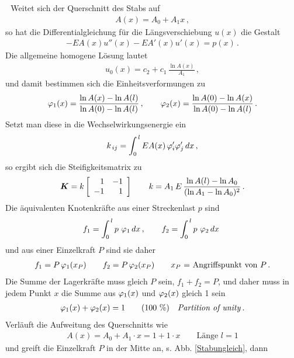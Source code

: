 {\,\, Weitet sich der Querschnitt des Stabs auf}
\begin{align}
A(x) = A_0 + A_1 x\,,
\end{align}
so hat die Differentialgleichung f\"{u}r die L\"{a}ngsverschiebung $u(x)$ die Gestalt
 \begin{align}
  - EA(x) u''(x) -EA'(x) u'(x) = p(x) \,.
\end{align}
Die allgemeine homogene L\"{o}sung lautet
\begin{align}
u_0(x) = c_2 + c_1\,\frac{\ln A(x)}{A_1}\,,
\end{align}
und damit bestimmen sich die Einheitsverformungen zu
\begin{align}
\Np_1(x) = \frac{\ln A(x) - \ln A(l)}{\ln A(0) - \ln A(l)}\,, \qquad
\Np_2(x) = \frac{\ln A(0) - \ln A(x)}{\ln A(0) - \ln A(l)}\,.
\end{align}
Setzt man diese in die Wechselwirkungsenergie ein
\begin{align}
 k_{\,ij} = \int_0^{\,l} EA(x)\, \Np_i' \Np_j' \, dx\,,
\end{align}
so ergibt sich die Steifigkeitsmatrix zu
\begin{align}
 \vek K = k \left [\barr {r
r} 1 & -1 \\ -1 & 1 \earr \right ] \qquad k = A_1\,E\,\frac{\ln A(l) - \ln A_0}{(\ln A_1
- \ln A_0)^2}\,.
\end{align}
Die \"{a}quivalenten Knotenkr\"{a}fte aus einer Streckenlast $p$ sind
\begin{align}
f_1 = \il p\, \,\Np_1\, dx\,, \qquad f_2 = \il p\, \,\Np_2\, dx\,\,
\end{align}
und aus einer Einzelkraft $P$ sind sie daher
\begin{align}
 f_1 = P\,
\Np_1(x_P) \qquad f_2 = P\, \Np_2(x_P) \qquad{} \mbox{$x_P$ = Angriffspunkt von $P$} \,.
\end{align}
Die Summe der Lagerkr\"{a}fte muss gleich $P$ sein, $f_1 + f_2 = P$, und daher muss
in jedem Punkt $x$ die Summe aus $\Np_1(x)$ und $\Np_2(x)$ gleich 1 sein
\begin{align}
 \Np_1(x) + \Np_2(x) = 1 \qquad{} \mbox{(100 \%)} \quad  \text{{\em Partition of unity\/}} \,.
\end{align}
Verl\"{a}uft die Aufweitung des Querschnitts wie
\begin{align}
A(x) = A_0 + A_1 \cdot  x = 1 + 1\cdot x \qquad{} \mbox{L\"{a}nge $l = 1$}
\end{align}
und greift die Einzelkraft $P$ in der Mitte an, s. Abb. \ref{Stabungleich}, dann
